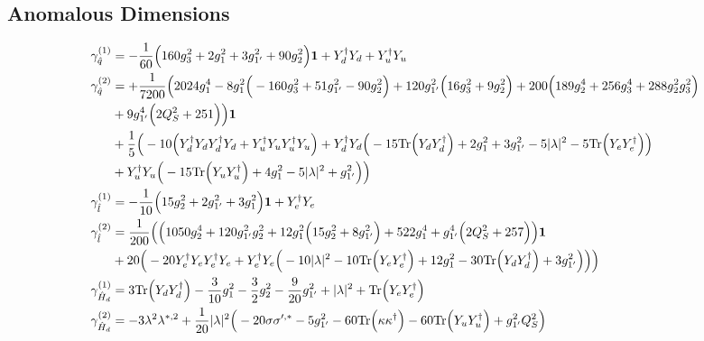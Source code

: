 \subsection{Anomalous Dimensions}
{\allowdisplaybreaks \begin{align} 
\gamma_{\hat{q}}^{(1)} & =  
-\frac{1}{60} \Big(160 g_{3}^{2}  + 2 g_{1}^{2}  + 3 g_{1'}^{2}  + 90 g_{2}^{2} \Big){\bf 1}  + {Y_{d}^{\dagger}  Y_d} + {Y_{u}^{\dagger}  Y_u}\\ 
\gamma_{\hat{q}}^{(2)} & =  
+\frac{1}{7200} \Big(2024 g_{1}^{4} -8 g_{1}^{2} \Big(-160 g_{3}^{2}  + 51 g_{1'}^{2}  -90 g_{2}^{2} \Big)+120 g_{1'}^{2} \Big(16 g_{3}^{2}  + 9 g_{2}^{2} \Big)+200 \Big(189 g_{2}^{4}  + 256 g_{3}^{4}  + 288 g_{2}^{2} g_{3}^{2} \Big)\nonumber \\ 
 &+9 g_{1'}^{4} \Big(2 Q_{S}^{2}  + 251\Big)\Big){\bf 1} \nonumber \\ 
 &+\frac{1}{5} \Big(-10 \Big({Y_{d}^{\dagger}  Y_d  Y_{d}^{\dagger}  Y_d} + {Y_{u}^{\dagger}  Y_u  Y_{u}^{\dagger}  Y_u}\Big)+{Y_{d}^{\dagger}  Y_d} \Big(-15 \mbox{Tr}\Big({Y_d  Y_{d}^{\dagger}}\Big)  + 2 g_{1}^{2}  + 3 g_{1'}^{2}  -5 |\lambda|^2  -5 \mbox{Tr}\Big({Y_e  Y_{e}^{\dagger}}\Big) \Big)\nonumber \\ 
 &+{Y_{u}^{\dagger}  Y_u} \Big(-15 \mbox{Tr}\Big({Y_u  Y_{u}^{\dagger}}\Big)  + 4 g_{1}^{2}  -5 |\lambda|^2  + g_{1'}^{2}\Big)\Big)\\ 
\gamma_{\hat{l}}^{(1)} & =  
-\frac{1}{10} \Big(15 g_{2}^{2}  + 2 g_{1'}^{2}  + 3 g_{1}^{2} \Big){\bf 1}  + {Y_{e}^{\dagger}  Y_e}\\ 
\gamma_{\hat{l}}^{(2)} & =  
\frac{1}{200} \Big(\Big(1050 g_{2}^{4}  + 120 g_{1'}^{2} g_{2}^{2}  + 12 g_{1}^{2} \Big(15 g_{2}^{2}  + 8 g_{1'}^{2} \Big) + 522 g_{1}^{4}  + g_{1'}^{4} \Big(2 Q_{S}^{2}  + 257\Big)\Big){\bf 1} \nonumber \\ 
 &+20 \Big(-20 {Y_{e}^{\dagger}  Y_e  Y_{e}^{\dagger}  Y_e}  + {Y_{e}^{\dagger}  Y_e} \Big(-10 |\lambda|^2  -10 \mbox{Tr}\Big({Y_e  Y_{e}^{\dagger}}\Big)  + 12 g_{1}^{2}  -30 \mbox{Tr}\Big({Y_d  Y_{d}^{\dagger}}\Big)  + 3 g_{1'}^{2} \Big)\Big)\Big)\\ 
\gamma_{\hat{H}_d}^{(1)} & =  
3 \mbox{Tr}\Big({Y_d  Y_{d}^{\dagger}}\Big)  -\frac{3}{10} g_{1}^{2}  -\frac{3}{2} g_{2}^{2}  -\frac{9}{20} g_{1'}^{2}  + |\lambda|^2 + \mbox{Tr}\Big({Y_e  Y_{e}^{\dagger}}\Big)\\ 
\gamma_{\hat{H}_d}^{(2)} & =  
-3 \lambda^{2} \lambda^{*,2} +\frac{1}{20} |\lambda|^2 \Big(-20 \sigma \sigma^{\prime,*}  -5 g_{1'}^{2}  -60 \mbox{Tr}\Big({\kappa  \kappa^{\dagger}}\Big)  -60 \mbox{Tr}\Big({Y_u  Y_{u}^{\dagger}}\Big)  + g_{1'}^{2} Q_{S}^{2} \Big)\nonumber \\ 

\end{align}}
